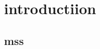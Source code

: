 \documentclass{report}
\begin{document}
\section{introductiion}
\label{sec:s}

\subsection{mss}
\end{document}
